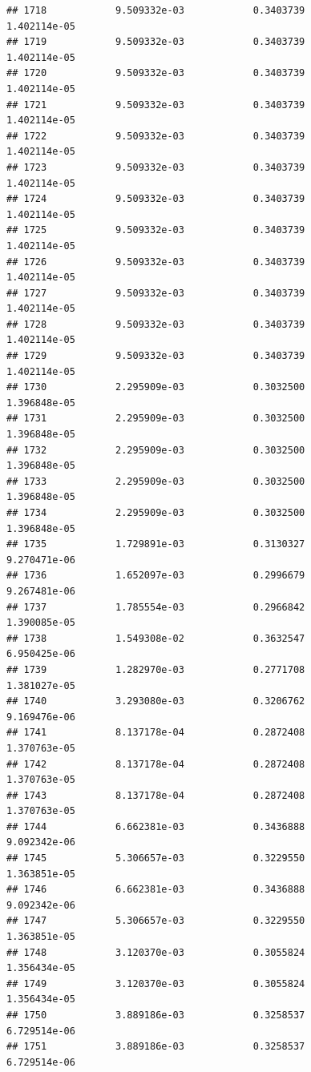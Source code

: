 \documentclass[
]{article}
\begin{document}
\begin{verbatim}
## 1718            9.509332e-03            0.3403739            1.402114e-05
## 1719            9.509332e-03            0.3403739            1.402114e-05
## 1720            9.509332e-03            0.3403739            1.402114e-05
## 1721            9.509332e-03            0.3403739            1.402114e-05
## 1722            9.509332e-03            0.3403739            1.402114e-05
## 1723            9.509332e-03            0.3403739            1.402114e-05
## 1724            9.509332e-03            0.3403739            1.402114e-05
## 1725            9.509332e-03            0.3403739            1.402114e-05
## 1726            9.509332e-03            0.3403739            1.402114e-05
## 1727            9.509332e-03            0.3403739            1.402114e-05
## 1728            9.509332e-03            0.3403739            1.402114e-05
## 1729            9.509332e-03            0.3403739            1.402114e-05
## 1730            2.295909e-03            0.3032500            1.396848e-05
## 1731            2.295909e-03            0.3032500            1.396848e-05
## 1732            2.295909e-03            0.3032500            1.396848e-05
## 1733            2.295909e-03            0.3032500            1.396848e-05
## 1734            2.295909e-03            0.3032500            1.396848e-05
## 1735            1.729891e-03            0.3130327            9.270471e-06
## 1736            1.652097e-03            0.2996679            9.267481e-06
## 1737            1.785554e-03            0.2966842            1.390085e-05
## 1738            1.549308e-02            0.3632547            6.950425e-06
## 1739            1.282970e-03            0.2771708            1.381027e-05
## 1740            3.293080e-03            0.3206762            9.169476e-06
## 1741            8.137178e-04            0.2872408            1.370763e-05
## 1742            8.137178e-04            0.2872408            1.370763e-05
## 1743            8.137178e-04            0.2872408            1.370763e-05
## 1744            6.662381e-03            0.3436888            9.092342e-06
## 1745            5.306657e-03            0.3229550            1.363851e-05
## 1746            6.662381e-03            0.3436888            9.092342e-06
## 1747            5.306657e-03            0.3229550            1.363851e-05
## 1748            3.120370e-03            0.3055824            1.356434e-05
## 1749            3.120370e-03            0.3055824            1.356434e-05
## 1750            3.889186e-03            0.3258537            6.729514e-06
## 1751            3.889186e-03            0.3258537            6.729514e-06

\end{verbatim}
\end{document}
